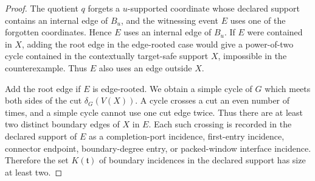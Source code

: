 \documentclass[11pt]{article}
\begin{document}
\begin{proof}
The quotient \(q\) forgets a \(u\)-supported coordinate whose declared support
contains an internal edge of \(B_u\), and the witnessing event \(E\) uses one
of the forgotten coordinates.  Hence \(E\) uses an internal edge of \(B_u\).
If \(E\) were contained in \(X\), adding the root edge in the edge-rooted case
would give a power-of-two cycle contained in the contextually target-safe support
\(X\), impossible in the counterexample.  Thus \(E\) also uses an edge outside
\(X\).

Add the root edge if \(E\) is edge-rooted.  We obtain a simple cycle of \(G\)
which meets both sides of the cut \(\delta_G(V(X))\).  A cycle crosses a cut an
even number of times, and a simple cycle cannot use one cut edge twice.  Thus
there are at least two distinct boundary edges of \(X\) in \(E\).  Each such
crossing is recorded in the declared support of \(E\) as a completion-port
incidence, first-entry incidence, connector endpoint, boundary-degree entry, or
packed-window interface incidence.  Therefore the set \(K(\mathfrak t)\) of
boundary incidences in the declared support has size at least two.
\end{proof}
\end{document}
